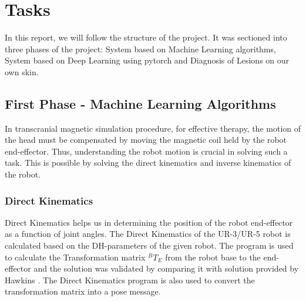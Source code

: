 \documentclass[conference]{IEEEtran}
\begin{document}


\section{Tasks}
In this report, we will follow the structure of the project. It was sectioned into three phases of the project: System based on Machine Learning algorithms, System based on Deep Learning using pytorch and Diagnosis of Lesions on our own skin.
\subsection{First Phase - Machine Learning Algorithms}
In transcranial magnetic simulation procedure, for effective therapy, the motion of the head must be compensated by moving the magnetic coil held by the robot end-effector. Thus, understanding the robot motion is crucial in solving such a task. This is possible by solving the direct kinematics and inverse kinematics of the robot. \\

\subsubsection{Direct Kinematics}
Direct Kinematics helps us in determining the position of the robot end-effector as a function of joint angles. The Direct Kinematics of the UR-3/UR-5 robot is calculated based on the DH-parameters of the given robot. The program is used to calculate the Transformation matrix $^B T_E$ from the robot base to the end-effector and the solution was validated by comparing it with solution provided by Hawkins \cite{hawkins2013analytic}. The Direct Kinematics program is also used to convert the transformation matrix into a pose message. \\
\end{document}
